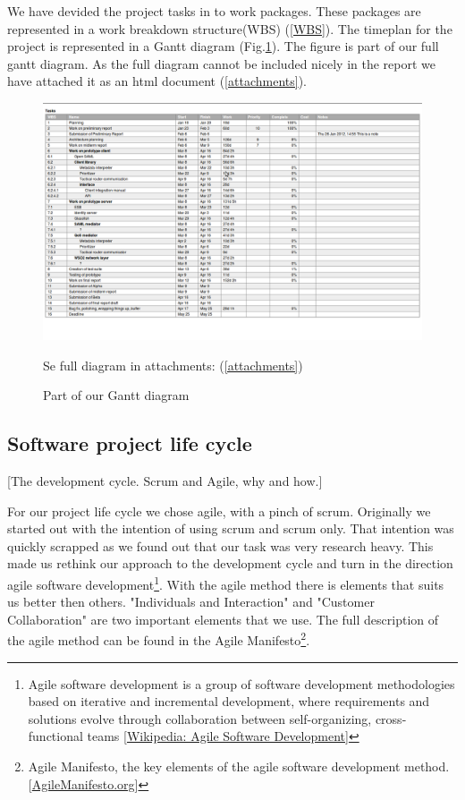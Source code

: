 \documentclass[12pt]{article}
\begin{document}
    We have devided the project tasks in to work packages. These packages are represented in a work breakdown structure(WBS) (\ref{WBS}). The timeplan for the project is represented in a Gantt diagram (Fig.\ref{fig:gantt}). The figure is part of our full gantt diagram. As the full diagram cannot be included nicely in the report we have attached it as an html document (\ref{attachments}).
     
        \begin{figure}[h]
            \centering
            \includegraphics[scale=0.3]{gantt}
            \caption{Part of our Gantt diagram} Se full diagram in attachments: (\ref{attachments})
            \label{fig:gantt}
        \end{figure}
    
    \subsection{Software project life cycle} [The development cycle. Scrum and Agile, why and how.]
    
    For our project life cycle we chose agile, with a pinch of scrum. Originally we started out with the intention of using scrum and scrum only. That intention was quickly scrapped as we found out that our task was very research heavy. This made us rethink our approach to the development cycle and turn in the direction agile software development\footnote
        {Agile software development is a group of software development methodologies based on iterative and incremental development, where requirements and solutions evolve through collaboration between self-organizing, cross-functional teams [\href{http://en.wikipedia.org/wiki/Agile_software_development.}{Wikipedia: Agile Software Development}]}. 
    With the agile method there is elements that suits us better then others. "Individuals and Interaction" and "Customer Collaboration" are two important elements that we use. The full description of the agile method can be found in the Agile Manifesto\footnote
        {Agile Manifesto, the key elements of the agile software development method. [\href{http://http://agilemanifesto.org/}{AgileManifesto.org}]}.
    
\end{document}
